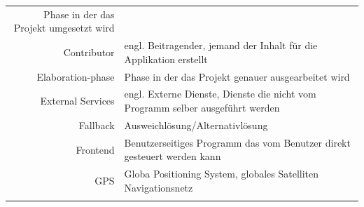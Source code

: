 \documentclass[ngerman,]{article}
\begin{document}
\begin{longtable}[]{@{}rl@{}}
\begin{minipage}[t]{0.76\columnwidth}
Phase in der das Projekt umgesetzt wird\strut
\end{minipage}\tabularnewline
\begin{minipage}[t]{0.18\columnwidth}\raggedleft\strut
Contributor\strut
\end{minipage} & \begin{minipage}[t]{0.76\columnwidth}\raggedright\strut
engl. Beitragender, jemand der Inhalt für die Applikation erstellt\strut
\end{minipage}\tabularnewline
\begin{minipage}[t]{0.18\columnwidth}\raggedleft\strut
Elaboration-phase\strut
\end{minipage} & \begin{minipage}[t]{0.76\columnwidth}\raggedright\strut
Phase in der das Projekt genauer ausgearbeitet wird\strut
\end{minipage}\tabularnewline
\begin{minipage}[t]{0.18\columnwidth}\raggedleft\strut
External Services\strut
\end{minipage} & \begin{minipage}[t]{0.76\columnwidth}\raggedright\strut
engl. Externe Dienste, Dienste die nicht vom Programm selber ausgeführt
werden\strut
\end{minipage}\tabularnewline
\begin{minipage}[t]{0.18\columnwidth}\raggedleft\strut
Fallback\strut
\end{minipage} & \begin{minipage}[t]{0.76\columnwidth}\raggedright\strut
Ausweichlösung/Alternativlösung\strut
\end{minipage}\tabularnewline
\begin{minipage}[t]{0.18\columnwidth}\raggedleft\strut
Frontend\strut
\end{minipage} & \begin{minipage}[t]{0.76\columnwidth}\raggedright\strut
Benutzerseitiges Programm das vom Benutzer direkt gesteuert werden
kann\strut
\end{minipage}\tabularnewline
\begin{minipage}[t]{0.18\columnwidth}\raggedleft\strut
GPS\strut
\end{minipage} & \begin{minipage}[t]{0.76\columnwidth}\raggedright\strut
Globa Positioning System, globales Satelliten Navigationsnetz\strut
\end{minipage}\tabularnewline
\begin{minipage}[t]{0.18\columnwidth}\raggedleft\strut

\end{minipage}
\end{longtable}
\end{document}
